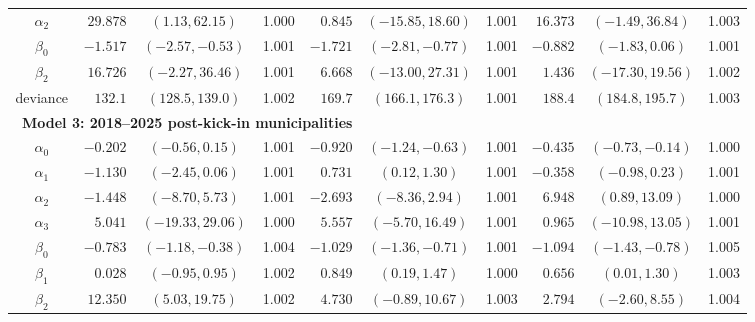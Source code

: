 \documentclass[letter,12pt]{article}
\newcommand{\mc}{\multicolumn}
\begin{document}
\begin{table}
{\begin{tabular}{c|rcr|rcr|rcr}
$\alpha_2$&  $29.878$ &     $(1.13, 62.15)$ & 1.000 & $ 0.845$ &        $(-15.85, 18.60)$ & 1.001 & $16.373$ &         $(-1.49, 36.84)$ & 1.003 \\
 $\beta_0$&  $-1.517$ &    $(-2.57, -0.53)$ & 1.001 & $-1.721$ &         $(-2.81, -0.77)$ & 1.001 & $-0.882$ &          $(-1.83, 0.06)$ & 1.001 \\
 $\beta_2$&  $16.726$ &    $(-2.27, 36.46)$ & 1.001 & $ 6.668$ &        $(-13.00, 27.31)$ & 1.001 & $ 1.436$ &        $(-17.30, 19.56)$ & 1.002 \\
deviance  &  $ 132.1$ &      $(128.5, 139.0)$ & 1.002 & $ 169.7$ &           $(166.1, 176.3)$ & 1.001 & $ 188.4$ &           $(184.8, 195.7)$ & 1.003 \\
  \mc{5}{l}{~\textbf{Model 3: 2018--2025 post-kick-in municipalities}} \\ %
$\alpha_0$&  $-0.202$ &     $(-0.56, 0.15)$ & 1.001 & $-0.920$ &         $(-1.24, -0.63)$ & 1.001 & $-0.435$ &         $(-0.73, -0.14)$ & 1.000 \\
$\alpha_1$&  $-1.130$ &     $(-2.45, 0.06)$ & 1.001 & $ 0.731$ &           $(0.12, 1.30)$ & 1.001 & $-0.358$ &          $(-0.98, 0.23)$ & 1.001 \\
$\alpha_2$&  $-1.448$ &     $(-8.70, 5.73)$ & 1.001 & $-2.693$ &          $(-8.36, 2.94)$ & 1.001 & $ 6.948$ &          $(0.89, 13.09)$ & 1.000 \\
$\alpha_3$&  $ 5.041$ &   $(-19.33, 29.06)$ & 1.000 & $ 5.557$ &         $(-5.70, 16.49)$ & 1.001 & $ 0.965$ &        $(-10.98, 13.05)$ & 1.001 \\
 $\beta_0$&  $-0.783$ &    $(-1.18, -0.38)$ & 1.004 & $-1.029$ &         $(-1.36, -0.71)$ & 1.001 & $-1.094$ &         $(-1.43, -0.78)$ & 1.005 \\
 $\beta_1$&  $ 0.028$ &     $(-0.95, 0.95)$ & 1.002 & $ 0.849$ &           $(0.19, 1.47)$ & 1.000 & $ 0.656$ &           $(0.01, 1.30)$ & 1.003 \\
 $\beta_2$&  $12.350$ &     $(5.03, 19.75)$ & 1.002 & $ 4.730$ &         $(-0.89, 10.67)$ & 1.003 & $ 2.794$ &          $(-2.60, 8.55)$ & 1.004 \\

\end{tabular}}
\end{table}
\end{document}

